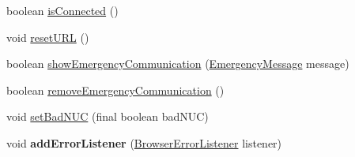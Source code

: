 \begin{DoxyCompactItemize}
\item 
boolean \hyperlink{classgov_1_1fnal_1_1ppd_1_1dd_1_1display_1_1client_1_1ConnectionToBrowserInstance_ad564b4814a0652f8ae7a14f70147e493}{is\-Connected} ()
\item 
void \hyperlink{classgov_1_1fnal_1_1ppd_1_1dd_1_1display_1_1client_1_1ConnectionToBrowserInstance_a43c95f4a9d8241a513fc1d4074748b06}{reset\-U\-R\-L} ()
\item 
boolean \hyperlink{classgov_1_1fnal_1_1ppd_1_1dd_1_1display_1_1client_1_1ConnectionToBrowserInstance_ad0e8239b4a95ac152c5746fb8249dfca}{show\-Emergency\-Communication} (\hyperlink{classgov_1_1fnal_1_1ppd_1_1dd_1_1emergency_1_1EmergencyMessage}{Emergency\-Message} message)
\item 
boolean \hyperlink{classgov_1_1fnal_1_1ppd_1_1dd_1_1display_1_1client_1_1ConnectionToBrowserInstance_a05ca59c4a52ee2d972cbd57dfd62c880}{remove\-Emergency\-Communication} ()
\item 
void \hyperlink{classgov_1_1fnal_1_1ppd_1_1dd_1_1display_1_1client_1_1ConnectionToBrowserInstance_a8d781733f348ac915b8ba330e2c5ec6b}{set\-Bad\-N\-U\-C} (final boolean bad\-N\-U\-C)
\item 
\hypertarget{classgov_1_1fnal_1_1ppd_1_1dd_1_1display_1_1client_1_1ConnectionToBrowserInstance_aa2c91771874c22df3f0f316f344f9d0f}{void {\bfseries add\-Error\-Listener} (\hyperlink{interfacegov_1_1fnal_1_1ppd_1_1dd_1_1display_1_1client_1_1BrowserErrorListener}{Browser\-Error\-Listener} listener)}\label{classgov_1_1fnal_1_1ppd_1_1dd_1_1display_1_1client_1_1ConnectionToBrowserInstance_aa2c91771874c22df3f0f316f344f9d0f}

\end{DoxyCompactItemize}
